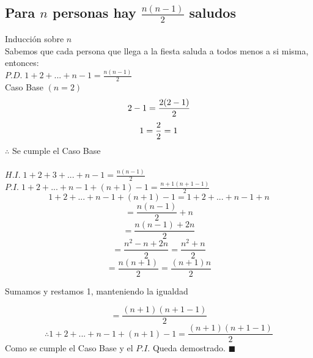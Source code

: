 \documentclass[11pt,letterpaper]{article}
\renewcommand\qedsymbol{$\blacksquare$}
\begin{document}
      \subsection{Para $n$ personas hay $\frac{n(n-1)}{2}$ saludos}
         Inducción sobre $n$ \\
         Sabemos que cada persona que llega a la fiesta saluda a todos menos a si misma, entonces:\\
         $P.D. \; 1+2+...+n-1 = \frac{n(n-1)}{2}$ \\
         \hspace{1cm} Caso Base $(n = 2)$
         \begin{equation}\notag 2-1 = \frac{2(2-1)}{2}\end{equation}
         \begin{equation}\notag 1 = \frac{2}{2} = 1\end{equation}
         $\therefore$ Se cumple el Caso Base \\ \\
         $H.I. \; 1+2+3+...+n-1 = \frac{n(n-1)}{2}$ \\
         $P.I. \; 1+2+...+n-1+(n+1)-1 = \frac{n+1(n+1-1)}{2}$ \\
         \begin{equation}
            1+2+...+n-1+(n+1)-1 = 1+2+...+n-1+n
         \end{equation}
         \begin{equation}\tag{Por $H.I.$}
            = \frac{n(n-1)}{2}+n
         \end{equation}
         \begin{equation}\tag{Sumamos $n$} = \frac{n(n-1)+2n}{2} \end{equation}
         \begin{equation}\tag{Desarrollamos} = \frac{n^{2}-n+2n}{2} = \frac{n^{2}+n}{2}\end{equation}
         \begin{equation}\tag{Conmutatividad} = \frac{n(n+1)}{2} = \frac{(n+1)n}{2} \end{equation}
         \begin{center}Sumamos y restamos 1, manteniendo la igualdad\end{center}
         \begin{equation} = \frac{(n+1)(n+1-1)}{2} \end{equation}
         \begin{equation}\tag{Conclusión} \therefore 1+2+...+n-1+(n+1)-1 = \frac{(n+1)(n+1-1)}{2}\end{equation}
         Como se cumple el Caso Base y el $P.I.$ Queda demostrado.  \qedsymbol
\end{document}
